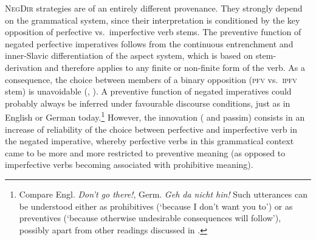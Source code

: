 \documentclass[output=paper,colorlinks,citecolor=brown]{langscibook}
\begin{document}
\textsc{NegDir} strategies are of an entirely different provenance. They strongly depend on the grammatical system, since their interpretation is conditioned by the key opposition of perfective vs.\ imperfective verb stems. The preventive function of negated perfective imperatives follows from the continuous entrenchment and inner-Slavic differentiation of the aspect system, which is based on stem-derivation and therefore applies to any finite or non-finite form of the verb. As a consequence, the choice between members of a binary opposition (\textsc{pfv} vs.\ \textsc{ipfv} stem) is unavoidable (\citealt{Wiemer2008}, \citealt{Seržant2017}). A preventive function of negated imperatives could probably always be inferred under favourable discourse conditions, just as in English or German today.\footnote{Compare Engl. \textit{Don't go there!}, Germ. \textit{Geh da nicht hin!} Such utterances can be understood either as prohibitives (`because I don't want you to') or as preventives (`because otherwise undesirable consequences will follow'), possibly apart from other readings discussed in .} However, the innovation (\citealt[29--30]{Ivić1958} and passim) consists in an increase of reliability of the choice between perfective and imperfective verb in the negated imperative, whereby perfective verbs in this grammatical context came to be more and more restricted to preventive meaning (as opposed to imperfective verbs becoming associated with prohibitive meaning).
\end{document}
